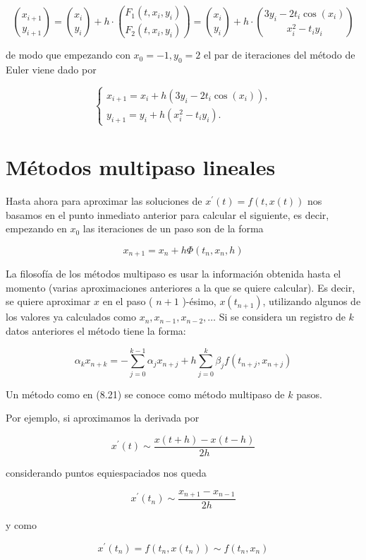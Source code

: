 \documentclass[10pt]{book}
\begin{document}
$$
\binom{x_{i+1}}{y_{i+1}}=\binom{x_{i}}{y_{i}}+h \cdot\binom{F_{1}\left(t, x_{i}, y_{i}\right)}{F_{2}\left(t, x_{i}, y_{i}\right)}=\binom{x_{i}}{y_{i}}+h \cdot\binom{3 y_{i}-2 t_{i} \cos \left(x_{i}\right)}{x_{i}^{2}-t_{i} y_{i}}
$$

de modo que empezando con $x_{0}=-1, y_{0}=2$ el par de iteraciones del método de Euler viene dado por

$$
\left\{\begin{array}{l}
x_{i+1}=x_{i}+h\left(3 y_{i}-2 t_{i} \cos \left(x_{i}\right)\right), \\
y_{i+1}=y_{i}+h\left(x_{i}^{2}-t_{i} y_{i}\right) .
\end{array}\right.
$$

\section{Métodos multipaso lineales}
Hasta ahora para aproximar las soluciones de $x^{\prime}(t)=f(t, x(t))$ nos basamos en el punto inmediato anterior para calcular el siguiente, es decir, empezando en $x_{0}$ las iteraciones de un paso son de la forma

$$
x_{n+1}=x_{n}+h \Phi\left(t_{n}, x_{n}, h\right)
$$

La filosofía de los métodos multipaso es usar la información obtenida hasta el momento (varias aproximaciones anteriores a la que se quiere calcular). Es decir, se quiere aproximar $x$ en el paso ( $n+1$ )-ésimo, $x\left(t_{n+1}\right)$, utilizando algunos de los valores ya calculados como $x_{n}, x_{n-1}, x_{n-2}, \ldots$ Si se considera un registro de $k$ datos anteriores el método tiene la forma:


\begin{equation*}
\alpha_{k} x_{n+k}=-\sum_{j=0}^{k-1} \alpha_{j} x_{n+j}+h \sum_{j=0}^{k} \beta_{j} f\left(t_{n+j}, x_{n+j}\right) \tag{8.21}
\end{equation*}


Un método como en (8.21) se conoce como método multipaso de $k$ pasos.

Por ejemplo, si aproximamos la derivada por

$$
x^{\prime}(t) \sim \frac{x(t+h)-x(t-h)}{2 h}
$$

considerando puntos equiespaciados nos queda

$$
x^{\prime}\left(t_{n}\right) \sim \frac{x_{n+1}-x_{n-1}}{2 h}
$$

y como

$$
x^{\prime}\left(t_{n}\right)=f\left(t_{n}, x\left(t_{n}\right)\right) \sim f\left(t_{n}, x_{n}\right)
$$
\end{document}
